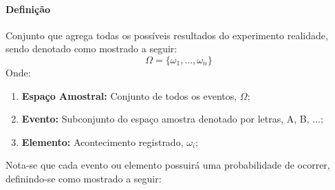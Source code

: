 \documentclass{article}
\begin{document}
            \paragraph{Definição}Conjunto que agrega todas os possíveis resultados do experimento realidade, sendo denotado como mostrado a seguir:
                \begin{equation}
                    \boxed{
                        \Omega = \{\omega_{1}, ... , \omega_{n} \}
                    }
                \end{equation}
            Onde:
                \begin{enumerate}[noitemsep]
                    \item \textbf{Espaço Amostral:} Conjunto de todos os eventos, $\Omega$;
                    \item \textbf{Evento:} Subconjunto do espaço amostra denotado por letras, A, B, ...;
                    \item \textbf{Elemento:} Acontecimento registrado, $\omega_{i}$;
                \end{enumerate}
            Nota-se que cada evento ou elemento possuirá uma probabilidade de ocorrer, definindo-se como mostrado a seguir:
\end{document}
